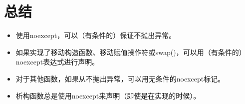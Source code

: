 \section{总结}
\begin{itemize}
	\item 使用noexcept，可以（有条件的）保证不抛出异常。
	\item 如果实现了移动构造函数、移动赋值操作符或swap()，可以用（有条件的）noexcept表达式进行声明。
	\item 对于其他函数，如果从不抛出异常，可以用无条件的noexcept标记。
	\item 析构函数总是使用noexcept来声明（即使是在实现的时候）。
\end{itemize}


